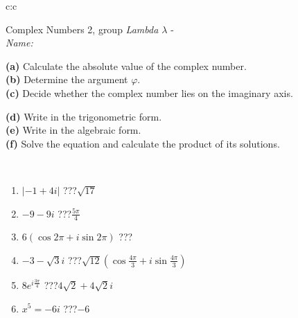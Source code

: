 \documentclass[10pt]{report}
\begin{document}
\newpage
\thispagestyle{empty}
\begin{tabular}{c:c}
\begin{minipage}[c][104.5mm][t]{0.5\linewidth}
\begin{center}
\vspace{5mm}
{\huge Complex Numbers 2, group \textit{Lambda $\lambda$} -}\\[5mm]
\textit{Name:}\phantom{xxxxxxxxxxxxxxxxxxxxxxxxxxxxxxxxxxxxxxxxxxxxxxxxxxxxxxxxxxxxxxxxx}\\[5mm]
\begin{minipage}{0.95\linewidth}
\begin{center}
{\small \begin{minipage}{0.44\textwidth} \raggedright
\textbf{(a)} Calculate the absolute value of the complex number. \\[1mm]
\textbf{(b)} Determine the argument \(\varphi\). \\[1mm]
\textbf{(c)} Decide whether the complex number lies on the imaginary axis. \end{minipage} \begin{minipage}{0.54\textwidth}
\textbf{(d)} Write in the trigonometric form. \\[1mm]
\textbf{(e)} Write in the algebraic form. \\[1mm]
\textbf{(f)} Solve the equation and calculate the product of its solutions.
\end{minipage}
}
\end{center}
\end{minipage}
\\[1mm]
\begin{minipage}{0.79\linewidth}
\begin{center}
\begin{varwidth}{\linewidth}
\setlength{\itemsep}{0pt}
\begin{enumerate}
\large
\item $|-1+4i|$\quad \dotfill\; ???\;\dotfill \quad $\sqrt{17}$
\item $-9-9i$\quad \dotfill\; ???\;\dotfill \quad $\frac{5\pi}{4}$
\item $6\left(\cos{2\pi}+i\sin{2\pi}\right)$\quad \dotfill\; ???\;\dotfill \quad {}
\item $-3-\sqrt{3}i$\quad \dotfill\; ???\;\dotfill \quad $\sqrt{12}\left(\cos{\frac{4\pi}{3}}+i\sin{\frac{4\pi}{3}}\right)$
\item $8e^{i\frac{3\pi}{4}}$\quad \dotfill\; ???\;\dotfill \quad $4\sqrt{2}+4\sqrt{2}i$
\item $x^5=-6i$\quad \dotfill\; ???\;\dotfill \quad $-6$

\end{enumerate}
\end{varwidth}
\end{center}
\end{minipage}
\end{center}
\end{minipage}
\end{tabular}
\end{document}
